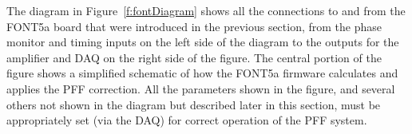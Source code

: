 

The diagram in Figure~\ref{f:fontDiagram} shows all the connections to and from the FONT5a board that were introduced in the previous section, from the phase monitor and timing inputs on the left side of the diagram to the outputs for the amplifier and DAQ on the right side of the figure. The central portion of the figure shows a simplified schematic of how the FONT5a firmware calculates and applies the PFF correction. All the parameters shown in the figure, and several others not shown in the diagram but described later in this section, must be appropriately set (via the DAQ) for correct operation of the PFF system.

